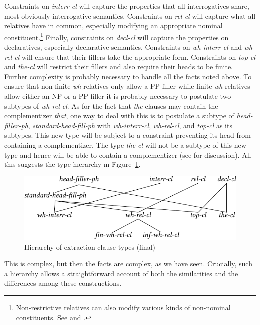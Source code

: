 \documentclass[output=paper
                ,modfonts
                ,nonflat
	        ,collection
	        ,collectionchapter
	        ,collectiontoclongg
 	        ,biblatex
                ,babelshorthands
                ,newtxmath
                ,draftmode
                ,colorlinks, citecolor=brown
]{./langsci/langscibook}
\begin{document}
{\noindent
Constraints on \emph{interr-cl} will capture the properties that all
interrogatives share, most obviously interrogative semantics.
Constraints on \emph{rel-cl} will capture what all relatives have in
common, especially modifying an appropriate nominal
constituent.\footnote{Non-restrictive relatives can also modify various
  kinds of non-nominal constituents. See \citet{Arnold:04} and
  \citet{Arnold:Borsley:08}.} Finally, constraints on \emph{decl-cl}
will capture the properties on declaratives, especially declarative
semantics.  Constraints on \emph{wh-interr-cl} and \emph{wh-rel-cl}
will ensure that their fillers take the appropriate form. Constraints
on \emph{top-cl} and \emph{the-cl} will restrict their fillers and
also require their heads to be finite. Further complexity is probably
necessary to handle all the facts noted above. To ensure that
non-finite \emph{wh}-relatives only allow a PP filler while finite
\emph{wh}-relatives allow either an NP or a PP filler it is probably
necessary to postulate two subtypes of \emph{wh-rel-cl}. As for the
fact that \emph{the}-clauses may contain the complementizer
\emph{that}, one way to deal with this is to postulate a subtype of
\emph{head-filler-ph}, \emph{standard-head-fill-ph} with
\emph{wh-interr-cl}, \emph{wh-rel-cl}, and \emph{top-cl} as its
subtypes. This new type will be subject to a constraint preventing its
head from containing a complementizer. The type \emph{the-cl} will not
be a subtype of this new type and hence will be able to contain a
complementizer (see \citealt{Borsley:11} for discussion). All this suggests
the type hierarchy in Figure~\ref{fig:UDC:50}. 
%
\begin{figure}[htb]
  \centering
  \includegraphics{figures/BB-extraction-function-hier-full-crop}
  \caption{\label{fig:UDC:50}Hierarchy of extraction clause types (final)}
  
\end{figure}
%
%
This is complex, but then the facts are complex, as we have seen.
Crucially, such a hierarchy allows a straightforward account of both the
similarities and the differences among these constructions.

}
\end{document}
